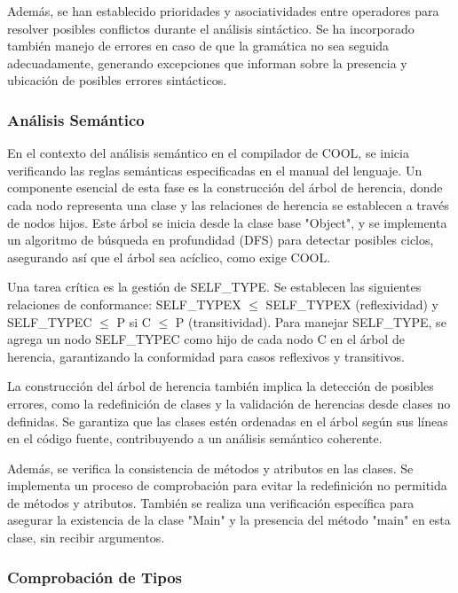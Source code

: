 \documentclass[10pt]{article} %
\begin{document}
	Además, se han establecido prioridades y asociatividades entre operadores para resolver posibles conflictos durante el análisis sintáctico. Se ha incorporado también manejo de errores en caso de que la gramática no sea seguida adecuadamente, generando excepciones que informan sobre la presencia y ubicación de posibles errores sintácticos.
	
	\subsubsection{An\'alisis Sem\'antico}
	
	En el contexto del análisis semántico en el compilador de COOL, se inicia verificando las reglas semánticas especificadas en el manual del lenguaje. Un componente esencial de esta fase es la construcción del árbol de herencia, donde cada nodo representa una clase y las relaciones de herencia se establecen a través de nodos hijos. Este árbol se inicia desde la clase base "Object", y se implementa un algoritmo de búsqueda en profundidad (DFS) para detectar posibles ciclos, asegurando así que el árbol sea acíclico, como exige COOL.
	
	Una tarea crítica es la gestión de SELF\_TYPE. Se establecen las siguientes relaciones de conformance: SELF\_TYPEX $\leq$ SELF\_TYPEX (reflexividad) y SELF\_TYPEC $\leq$ P si C $\leq$ P (transitividad). Para manejar SELF\_TYPE, se agrega un nodo SELF\_TYPEC como hijo de cada nodo C en el árbol de herencia, garantizando la conformidad para casos reflexivos y transitivos.
	
	La construcción del árbol de herencia también implica la detección de posibles errores, como la redefinición de clases y la validación de herencias desde clases no definidas. Se garantiza que las clases estén ordenadas en el árbol según sus líneas en el código fuente, contribuyendo a un análisis semántico coherente.
	
	Además, se verifica la consistencia de métodos y atributos en las clases. Se implementa un proceso de comprobación para evitar la redefinición no permitida de métodos y atributos. También se realiza una verificación específica para asegurar la existencia de la clase "Main" y la presencia del método "main" en esta clase, sin recibir argumentos.
	
	\subsubsection{Comprobaci\'on de Tipos}
	
\end{document}
